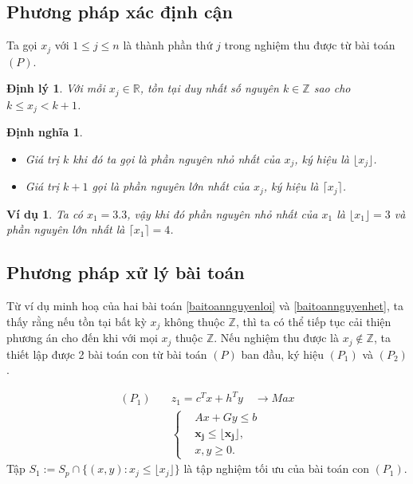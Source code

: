 \documentclass[12pt,a4paper]{report}
\newtheorem{dn}{Định nghĩa}
\newtheorem{dl}{Định lý}
\newtheorem{vd}{Ví dụ}
\begin{document}
\subsection*{Phương pháp xác định cận}
Ta gọi $x_j$ với $1 \leq j \leq n$ là thành phần thứ $j$ trong nghiệm thu được từ bài toán $(P)$.

\begin{dl}\label{cmnguyen}
Với mỗi $x_j \in \mathbb{R}$, tồn tại duy nhất số nguyên $k \in \mathbb{Z}$ sao cho $k \leq x_j < k+1$.
\end{dl}

\begin{dn}
\phantom{}
\begin{itemize}
\item Giá trị $k$ khi đó ta gọi là phần nguyên nhỏ nhất của $x_j$, ký hiệu là $\lfloor x_j \rfloor$.
\item Giá trị $k+1$ gọi là phần nguyên lớn nhất của $x_j$, ký hiệu là $\lceil x_j \rceil$.
\end{itemize}
\end{dn}

\begin{vd}
Ta có $x_1=3.3$, vậy khi đó phần nguyên nhỏ nhất của $x_1$ là $\lfloor x_1 \rfloor = 3$ và phần nguyên lớn nhất là $\lceil x_1 \rceil =4$.
\end{vd}

\subsection*{Phương pháp xử lý bài toán}

Từ ví dụ minh hoạ của hai bài toán \eqref{baitoannguyenloi} và \eqref{baitoannguyenhet}, ta thấy rằng nếu tồn tại bất kỳ $x_j$ không thuộc $\mathbb{Z}$, thì ta có thể tiếp tục cải thiện phương án cho đến khi với mọi $x_j$ thuộc $\mathbb{Z}$. 
Nếu nghiệm thu được là $x_j \notin \mathbb{Z}$, ta thiết lập được 2 bài toán con từ bài toán $(P)$ ban đầu, ký hiệu $(P_1)$ và $(P_2)$.

\begin{equation}
    \begin{split}
    (P_1) \quad & z_1=c^Tx+h^Ty \quad \longrightarrow Max \\
                & \left\{\begin{split}
                    &Ax+Gy \leq  b \\
                    &\mathbf{x_j \leq \lfloor x_j \rfloor ,} \\
                    &x,y \geq 0.
                \end{split}\right.    
    \end{split}
\end{equation}
Tập $S_1:=S_p \cap \{ (x,y): x_j \leq \lfloor x_j \rfloor \}$ là tập nghiệm tối ưu của bài toán con $(P_1)$.
\end{document}
